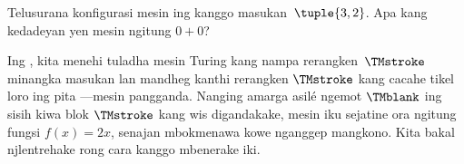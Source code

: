 \documentclass[../../../include/open-logic-section]{subfiles}
\begin{document}
\begin{prob}
Telusurana konfigurasi mesin ing
 kanggo masukan~$\tuple{3,2}$.
Apa kang kedadeyan yen mesin ngitung $0+0$?
\end{prob}

\begin{explain}
Ing , kita menehi tuladha
mesin Turing kang nampa rerangken~$\TMstroke$
minangka masukan lan mandheg kanthi rerangken
$\TMstroke$ kang cacahe tikel loro ing pita
---mesin pangganda. Nanging amarga asilé
ngemot $\TMblank$ ing sisih kiwa blok
$\TMstroke$ kang wis digandakake, mesin iku
sejatine ora ngitung fungsi $f(x) = 2x$,
senajan mbokmenawa kowe nganggep mangkono.
Kita bakal njlentrehake rong cara kanggo
mbenerake iki.
\end{explain}
\end{document}
